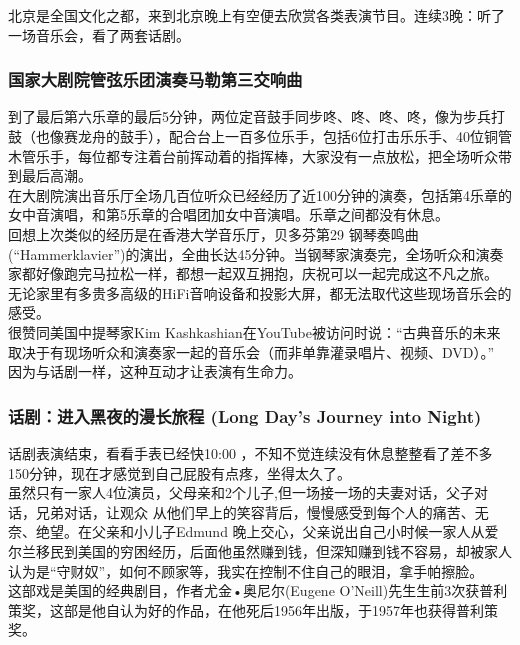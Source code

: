 \documentclass{article}        %
\date{}
\begin{document}



北京是全国文化之都，来到北京晚上有空便去欣赏各类表演节目。连续3晚：听了一场音乐会，看了两套话剧。

\hypertarget{ux56fdux5bb6ux5927ux5267ux9662ux7ba1ux5f26ux4e50ux56e2ux6f14ux594fux9a6cux52d2ux7b2cux4e09ux4ea4ux54cdux66f2}{%
\subsubsection{国家大剧院管弦乐团演奏马勒第三交响曲}\label{ux56fdux5bb6ux5927ux5267ux9662ux7ba1ux5f26ux4e50ux56e2ux6f14ux594fux9a6cux52d2ux7b2cux4e09ux4ea4ux54cdux66f2}}

到了最后第六乐章的最后5分钟，两位定音鼓手同步咚、咚、咚、咚，像为步兵打鼓（也像赛龙舟的鼓手），配合台上一百多位乐手，包括6位打击乐乐手、40位铜管木管乐手，每位都专注着台前挥动着的指挥棒，大家没有一点放松，把全场听众带到最后高潮。\\
在大剧院演出音乐厅全场几百位听众已经经历了近100分钟的演奏，包括第4乐章的女中音演唱，和第5乐章的合唱团加女中音演唱。乐章之间都没有休息。\\
回想上次类似的经历是在香港大学音乐厅，贝多芬第29
钢琴奏鸣曲(``Hammerklavier'')的演出，全曲长达45分钟。当钢琴家演奏完，全场听众和演奏家都好像跑完马拉松一样，都想一起双互拥抱，庆祝可以一起完成这不凡之旅。\\
无论家里有多贵多高级的HiFi音响设备和投影大屏，都无法取代这些现场音乐会的感受。\\
很赞同美国中提琴家Kim
Kashkashian在YouTube被访问时说：``古典音乐的未来取决于有现场听众和演奏家一起的音乐会（而非单靠灌录唱片、视频、DVD）。''\\
因为与话剧一样，这种互动才让表演有生命力。

\hypertarget{ux8bddux5267ux8fdbux5165ux9ed1ux591cux7684ux6f2bux957fux65c5ux7a0b-long-days-journey-into-night}{%
\subsubsection{话剧：进入黑夜的漫长旅程 (Long Day's Journey into
Night)}\label{ux8bddux5267ux8fdbux5165ux9ed1ux591cux7684ux6f2bux957fux65c5ux7a0b-long-days-journey-into-night}}

话剧表演结束，看看手表已经快10:00
，不知不觉连续没有休息整整看了差不多150分钟，现在才感觉到自己屁股有点疼，坐得太久了。\\
虽然只有一家人4位演员，父母亲和2个儿子,但一场接一场的夫妻对话，父子对话，兄弟对话，让观众
从他们早上的笑容背后，慢慢感受到每个人的痛苦、无奈、绝望。在父亲和小儿子Edmund
晚上交心，父亲说出自己小时候一家人从爱尔兰移民到美国的穷困经历，后面他虽然赚到钱，但深知赚到钱不容易，却被家人认为是``守财奴''，如何不顾家等，我实在控制不住自己的眼泪，拿手帕擦脸。\\
这部戏是美国的经典剧目，作者尤金•奥尼尔(Eugene
O'Neill)先生生前3次获普利策奖，这部是他自认为好的作品，在他死后1956年出版，于1957年也获得普利策奖。
\end{document}
